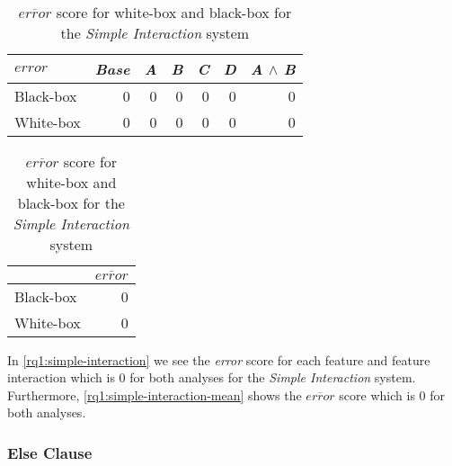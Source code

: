\begin{table}[H]
\begin{minipage}{.5\linewidth}
    \centering
    \begin{tabular}{lrrrrrr}    \toprule
    $error$     & \emph{Base} & \emph{A} & \emph{B} & \emph{C} & \emph{D} & \emph{A} $\land$ \emph{B}   \\ \midrule
    Black-box & 0 & 0 & 0 & 0 & 0 & 0      \\
    White-box & 0 & 0 & 0 & 0 & 0 & 0      \\ \bottomrule
    \end{tabular}
    \caption{Respective \emph{error} scores for white-box and black-box {\perfInfluenceModel}s for the \emph{Simple Interaction} system.}
    \label{rq1:simple-interaction}
\end{minipage}%
\hspace{7mm}
\begin{minipage}{.37\linewidth}
    \centering
    \begin{tabular}{lr}
        \toprule
                  & $\overline{error}$   \\ \midrule
        Black-box & 0              \\
        White-box & 0              \\ \bottomrule
        \end{tabular}  
        \caption{$\overline{error}$ score for white-box and black-box for the \emph{Simple Interaction} system}
        \label{rq1:simple-interaction-mean}
    \end{minipage}
\end{table}

In \autoref{rq1:simple-interaction} we see the \emph{error} score for each 
feature and feature interaction which is $0$ for both analyses for the \emph{Simple Interaction} system. 
Furthermore, \autoref{rq1:simple-interaction-mean} shows the $\overline{error}$ score which is $0$ for both analyses.

\subsubsection*{Else Clause}

